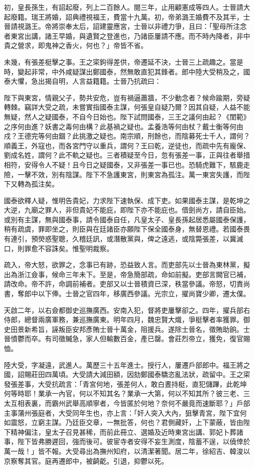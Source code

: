 \begin{pinyinscope}
初，皇長孫生，有詔起廢，列上二百餘人。閱三年，止用顧憲成等四人。士晉請大起廢籍。瑞王將婚，詔典禮視福王，費當十九萬。初，帝弟潞王婚費不及其半，士晉請視潞王。帝將崇奉太后，詔建靈應宮，士晉以非禮力爭，且曰：「聖母所注念者東宮出講，諸王早婚，與遺賢之登進也，乃諸臣屢請不應。而不時內降者，非中貴之營求，即鬼神之香火，何也？」帝皆不省。

未幾，有張差梃擊之事。王之寀鉤得差供，帝遷延不決，士晉三上疏趣之。當是時，變起非常，中外咸疑謀出鄭國泰，然無敢直犯其鋒者。郎中陸大受稍及之，國泰大懼，急出揭自明，人言益籍籍。士晉乃抗疏曰：

陛下與東宮，情親父子，勢共安危，豈有禍逼蕭牆，不少動念者？候命踰期，旁疑轉棘。竊詳大受之疏，未嘗實指國泰主謀，何張皇自疑乃爾？因其自疑，人益不能無疑，然人之疑國泰，不自今日始也。陛下試問國泰，三王之議何由起？《閨範》之序何由進？妖書之毒何由構？此基禍之疑也。孟養浩等何由杖？戴士衡等何由戍？王德完等何由錮？此挑激之疑也。南宗順，刑餘也，而陰募死士千人，謂何？順義王，外寇也，而各宮門守以重兵，謂何？王曰乾，逆徒也，而疏中先有龐保、劉成名姓，謂何？此不軌之疑也。三者積疑至今日，忽有張差一事，正與往者舉措相符，安得令人不疑！且今日之疑國泰，又非張差一事已也。恐騎虎難下，駭鹿走險，一擊不效，別有陰謀。陛下不急護東宮，則東宮為孤注。萬一東宮失護，而陛下又轉為孤注矣。

國泰欲釋人疑，惟明告貴妃，力求陛下速執保、成下吏。如果國泰主謀，是乾坤之大逆，九廟之罪人，非但貴妃不能庇，即陛下亦不能庇也。借劍尚方，請自臣始。或別有主謀，無與國泰事，請令國泰自任，凡皇太子、皇長孫起居悉屬國泰保護，稍有疏虞，罪即坐之，則臣與在廷諸臣亦願陛下保全國泰身，無替恩禮。若國泰畏有連引，預熒惑聖聰，久稽廷訊，或潛散黨與，俾之遠逃，或陰斃張差，以冀滅口，則罪愈不容誅矣。惟聖明裁察。

疏入，帝大怒，欲罪之，念事已有跡，恐益致人言。而吏部先以士晉為東林黨，擬出為浙江僉事，候命三年未下。至是，帝急簡部疏，命如前擬。吏部言闕官已補，請改命。帝不許，命調前補者。吏部又以士晉積資已深，秩當參議。帝怒，切責尚書，奪郎中以下俸。士晉之官四年，移廣西參議。光宗立，擢尚寶少卿，遷太僕。

天啟二年，以右僉都御史巡撫廣西。安南入犯，督將吏屢擊卻之。四年，擢兵部右侍郎，總督兩廣軍務，兼巡撫廣東。明年四月，魏忠賢大熾，爭梃擊者率獲罪。御史田景新希旨，誣叛臣安邦彥賄士晉十萬金，阻援兵。遂除士晉名，徵賄助餉。士晉憤鬱而卒。有司徵贓急，家人但輸數百金，產已罄。會莊烈帝立，獲免，復官賜恤。

陸大受，字凝遠，武進人。萬歷三十五年進士。授行人，屢遷戶部郎中。福王將之國，詔賜莊田四萬頃。大受請大減田額，因劾鄭國泰驕恣亂法狀，疏留中。王之寀發張差事，大受抗疏言：「青宮何地，張差何人，敢白晝持梃，直犯儲蹕，此乾坤何等時耶！業承一內官，何以不知其名？業承一大第，何以不知其所？彼三老、三太互相表裏，而霸州武舉高順寧者，今皆匿於何地？奈何不嚴竟而速斷耶？」戶部主事蒲州張庭者，大受同年生也，亦上言：「奸人突入大內，狙擊青宮，陛下宜何如震怒，立窮主謀。乃廷臣交章，一無批答，何也？君側藏奸，上下蒙蔽，皆由陛下精神偏注，皇太子召見甚稀，而前此冊立、選婚及近時東宮出講、郭妃卜葬諸事，陛下皆弗勝遲回，強而後可。彼宦寺者安得不妄生測度，陰蓄不逞，以僥倖於萬一哉！」皆不報。大受尋出為撫州知府，以清潔著聞。居二年，徐紹吉、韓浚以京察奪其官。庭再遷郎中，被齮齕。引退，抑鬱以死。


\end{pinyinscope}

